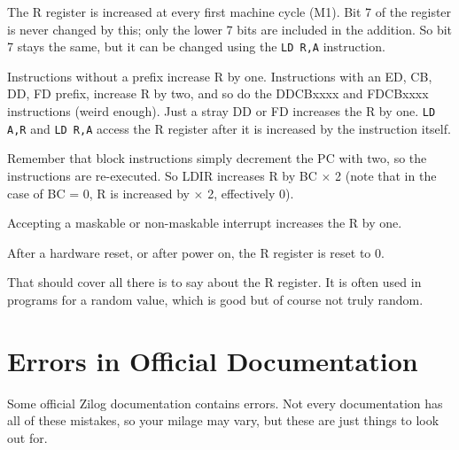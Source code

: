 The R register is increased at every first machine cycle (M1). Bit 7 of the register is never changed by this; only the lower 7 bits are included in the addition. So bit 7 stays the same, but it can be changed using the
{\tt LD R,A} instruction.

Instructions without a prefix increase R by one. Instructions with an ED, CB, DD, FD prefix, increase R by two, and so do the DDCBxxxx and FDCBxxxx instructions (weird enough). Just a stray DD or FD increases the R by one. {\tt LD A,R} and {\tt LD R,A} access the R register after it is increased by the instruction itself. 

Remember that block instructions simply decrement the PC with two, so the instructions are re-executed. So LDIR increases R by BC $\times$ 2 (note that in the case of BC = 0, R is increased by  $\times$ 2, effectively 0).

Accepting a maskable or non-maskable interrupt increases the R by one.

After a hardware reset, or after power on, the R register is reset to 0.

That should cover all there is to say about the R register. It is often used in programs for a random value, which is good but of course not truly random.


\pagebreak
\section{Errors in Official Documentation}

Some official Zilog documentation contains errors. Not every documentation has all of these mistakes, so your milage may vary, but these are just things to look out for.

